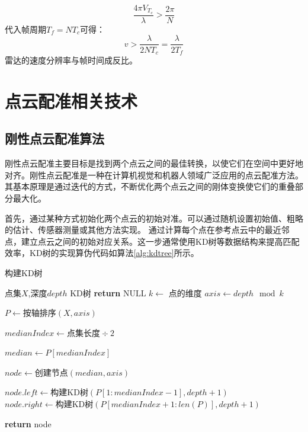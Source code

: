 \begin{equation}
	\frac{4\pi V_{T_c}}{\lambda} > \frac{2\pi}{N}
\end{equation}
代入帧周期$T_f = N T_c$可得：
\begin{equation}
	v > \frac{\lambda}{2N T_c} = \frac{\lambda}{2 T_f}
\end{equation}
雷达的速度分辨率与帧时间成反比。


\section{点云配准相关技术}

\subsection{刚性点云配准算法}
刚性点云配准主要目标是找到两个点云之间的最佳转换\cite{tam2012registration}，以使它们在空间中更好地对齐。刚性点云配准是一种在计算机视觉和机器人领域广泛应用的点云配准方法\cite{JSJX201909003}。其基本原理是通过迭代的方式，不断优化两个点云之间的刚体变换使它们的重叠部分最大化。

首先，通过某种方式初始化两个点云的初始对准。可以通过随机设置初始值、粗略的估计、传感器测量或其他方法实现。
通过计算每个点在参考点云中的最近邻点，建立点云之间的初始对应关系。这一步通常使用KD树\cite{bentley1990k}等数据结构来提高匹配效率，KD树的实现算伪代码如算法\ref{alg:kdtree}所示。

\begin{algorithm}[htbp]
	\caption{构建KD树}\label{alg:kdtree}
	\begin{algorithmic}[1]
		\Require 点集$X$,深度$depth$
		\Ensure KD树
		\State \textbf{return} $\text{NULL}$
		\EndIf
		\State $k \gets$ 点的维度
		\State $axis \gets depth \mod k$
		
		\State $P \gets \text{按轴排序}(X, axis)$ 
		
		\State $medianIndex  \gets \text{点集长度} \div 2$ 
		
		\State $median \gets P[medianIndex]$ 
		
		\State $node \gets \text{创建节点}(median, axis)$ 
		
		\State $node.left \gets \text{构建KD树}(P[1 : medianIndex-1], depth + 1)$
		\State $node.right \gets \text{构建KD树}(P[medianIndex+1 : len(P)], depth + 1)$
		
		\State \textbf{return} node
	\end{algorithmic}
\end{algorithm}

